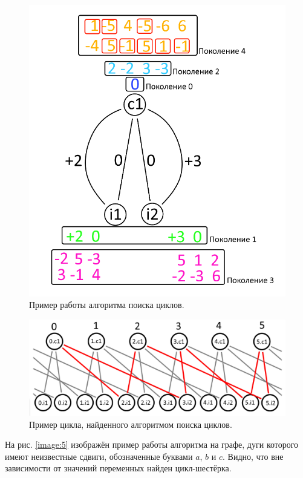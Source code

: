 \documentclass[14pt]{mmcs_article}
\begin{document}
\begin{figure}[H]
  \centering
  \includegraphics[scale=0.4]{Fig_3.png}
  \caption{ Пример работы алгоритма поиска циклов. }
  \label{image:3}
\end{figure}

\begin{figure}[H]
  \centering
  \includegraphics[scale=0.4]{Fig_4.png}
  \caption{ Пример цикла, найденного алгоритмом поиска циклов. }
  \label{image:4}
\end{figure}

На рис. \ref{image:5} изображён пример работы алгоритма на графе, дуги которого имеют неизвестные сдвиги, обозначенные буквами $a$, $b$ и $c$. Видно, что вне зависимости от значений переменных найден цикл-шестёрка.
\end{document}
